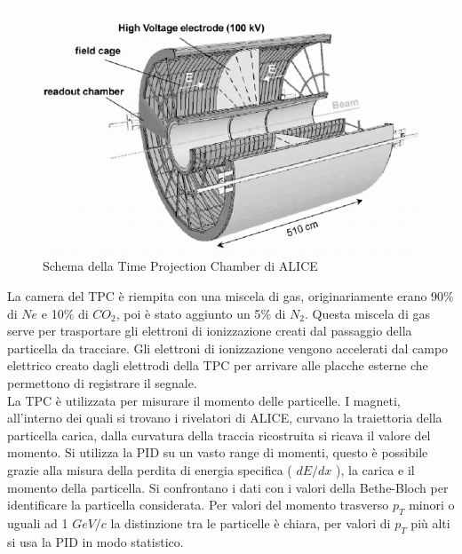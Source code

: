      \begin{figure}[htbp]
        \centering
        \includegraphics[width=0.6\linewidth]{ALICE/ALICE-TPC-detector.png}
        \caption{Schema della Time Projection Chamber di ALICE}
        \label{fig:TPCcomplex}
    \end{figure}
    
    La camera del TPC è riempita con una miscela di gas, originariamente erano 90$\%$ di $Ne$ e 10$\%$ di $CO_2$, poi è stato aggiunto un 5$\%$ di $N_2$. Questa miscela di gas serve per trasportare gli elettroni di ionizzazione creati dal passaggio della particella da tracciare. Gli elettroni di ionizzazione vengono accelerati dal campo elettrico creato dagli elettrodi della TPC per arrivare alle placche esterne che permettono di registrare il segnale. \cite{Collaboration_2008_ALICE}
    \\La TPC è utilizzata per misurare il momento delle particelle. I magneti, all'interno dei quali si trovano i rivelatori di ALICE, curvano la traiettoria della particella carica, dalla curvatura della traccia ricostruita si ricava il valore del momento. Si utilizza la PID su un vasto range di momenti, questo è possibile grazie alla misura della perdita di energia specifica ( $dE/dx$ ), la carica e il momento della particella. Si confrontano i dati con i valori della Bethe-Bloch per identificare la particella considerata. Per valori del momento trasverso $p_T$ minori o uguali ad 1 $GeV/c$  la distinzione tra le particelle è chiara, per valori di $p_T$ più alti si usa la PID in modo statistico. 
    
    
    
    
    
    
    